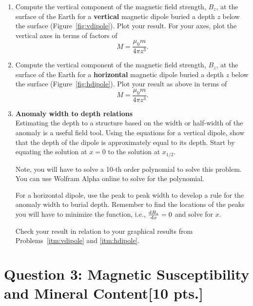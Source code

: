 \documentclass[11pt,a4paper]{article}
\begin{document}
\begin{enumerate}
    \item Compute the vertical component of the magnetic field strength, $B_{z}$, at the surface of the Earth for a {\bf vertical} magnetic dipole buried a depth $z$ below the surface (Figure~\ref{fig:vdipole}).  Plot your result.  For your axes, plot the vertical axes in terms of factors of
    \begin{equation}
        M = \frac{\mu_0 m}{4 \pi z^3} .
    \end{equation}
    

    \item Compute the vertical component of the magnetic field strength, $B_{z}$, at the surface of the Earth for a {\bf horizontal} magnetic dipole buried a depth $z$ below the surface (Figure~\ref{fig:hdipole}).  Plot your result as above in terms of
    \begin{equation}
        M = \frac{\mu_0 m}{4 \pi z^3} .
    \end{equation}

    \item {\bf Anomaly width to depth relations} \\
    Estimating the depth to a structure based on the width or half-width of the anomaly is a useful field tool.  Using the equations for a vertical dipole, show that the depth of the dipole is approximately equal to its depth.  Start by equating the solution at $x=0$ to the solution at $x_{1/2}$.

    Note, you will have to solve a 10-th order polynomial to solve this problem.  You can use Wolfram Alpha online to solve for the polynomial.
    
    For a horizontal dipole, use the peak to peak width to develop a rule for the anomaly width to burial depth.  Remember to find the locations of the peaks you will have to minimize the function, i.e., $\dv{B_z}{x} = 0$ and solve for $x$.
        
    Check your result in relation to your graphical results from Problems~\ref{itm:vdipole} and \ref{itm:hdipole}.
\end{enumerate}


\section*{Question 3: Magnetic Susceptibility and Mineral Content\hfill [10 pts.]}
\end{document}

